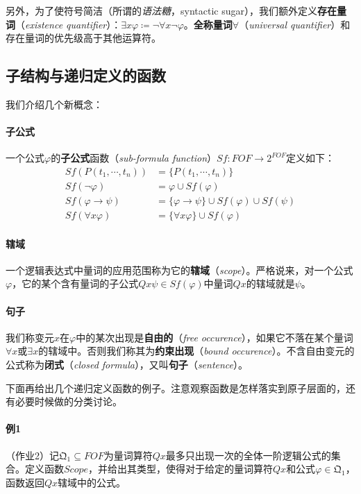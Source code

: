 \documentclass[b5paper,oneside]{ctexbook}
\begin{document}
另外，为了使符号简洁（所谓的\textit{语法糖}，syntactic sugar），我们额外定义\textbf{存在量词}（\textit{existence quantifier}）：$\exists x\varphi\coloneqq \neg\forall x\neg\varphi$。\textbf{全称量词}$\forall$（\textit{universal quantifier}）和存在量词的优先级高于其他运算符。

\subsection{子结构与递归定义的函数}
我们介绍几个新概念：
\paragraph{子公式}一个公式$\varphi$的\textbf{子公式}函数（\textit{sub-formula function}）$Sf:FOF\to 2^{FOF}$定义如下：
\begin{align*}
Sf(P(t_1,\cdots ,t_n))&=\{P(t_1,\cdots ,t_n)\}
\\Sf(\neg\varphi)&=\varphi\cup Sf(\varphi)
\\Sf(\varphi\to\psi)&=\{\varphi\to\psi\}\cup Sf(\varphi)\cup Sf(\psi)
\\Sf(\forall x\varphi)&=\{\forall x\varphi\}\cup Sf(\varphi)
\end{align*}
\paragraph{辖域}一个逻辑表达式中量词的应用范围称为它的\textbf{辖域}（\textit{scope}）。严格说来，对一个公式$\varphi$，它的某个含有量词的子公式$Qx\psi\in Sf(\varphi)$中量词$Qx$的辖域就是$\psi$。
\paragraph{句子}我们称变元$x$在$\varphi$中的某次出现是\textbf{自由的}（\textit{free occurence}），如果它不落在某个量词$\forall x$或$\exists x$的辖域中。否则我们称其为\textbf{约束出现}（\textit{bound occurence}）。不含自由变元的公式称为\textbf{闭式}（\textit{closed formula}），又叫\textbf{句子}（\textit{sentence}）。\label{sentence}

下面再给出几个递归定义函数的例子。\label{folrec}注意观察函数是怎样落实到原子层面的，还有必要时候做的分类讨论。
\paragraph{例1}（作业2）记$\mathfrak{Q}_{1}\subseteq FOF$为量词算符$Qx$最多只出现一次的全体一阶逻辑公式的集合。定义函数$Scope$，并给出其类型，使得对于给定的量词算符$Qx$和公式$\varphi\in\mathfrak{Q}_1$，函数返回$Qx$辖域中的公式。
\end{document}
